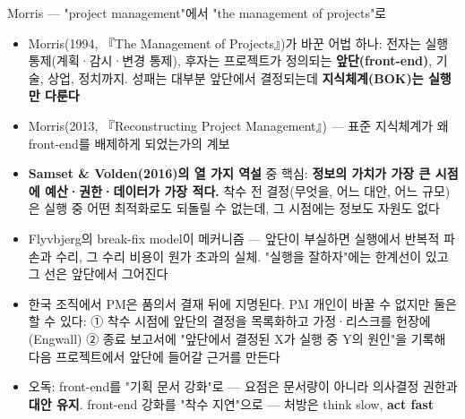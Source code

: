 \begin{frame}[allowframebreaks=1.0]{Morris — "project management"에서 "the management of projects"로}
\small
\begin{itemize}
\item\relax Morris(1994, 『The Management of Projects』)가 바꾼 어법 하나: 전자는 실행 통제(계획·감시·변경 통제), 후자는 프로젝트가 정의되는 \textbf{앞단(front-end)}, 기술, 상업, 정치까지. 성패는 대부분 앞단에서 결정되는데 \textbf{지식체계(BOK)는 실행만 다룬다}
\item\relax Morris(2013, 『Reconstructing Project Management』) — 표준 지식체계가 왜 front-end를 배제하게 되었는가의 계보
\item\relax \textbf{Samset \& Volden(2016)의 열 가지 역설} 중 핵심: \textbf{정보의 가치가 가장 큰 시점에 예산·권한·데이터가 가장 적다.} 착수 전 결정(무엇을, 어느 대안, 어느 규모)은 실행 중 어떤 최적화로도 되돌릴 수 없는데, 그 시점에는 정보도 자원도 없다
\item\relax Flyvbjerg의 break-fix model이 메커니즘 — 앞단이 부실하면 실행에서 반복적 파손과 수리, 그 수리 비용이 원가 초과의 실체. "실행을 잘하자"에는 한계선이 있고 그 선은 앞단에서 그어진다
\item\relax 한국 조직에서 PM은 품의서 결재 뒤에 지명된다. PM 개인이 바꿀 수 없지만 둘은 할 수 있다: ① 착수 시점에 앞단의 결정을 목록화하고 가정·리스크를 헌장에(Engwall) ② 종료 보고서에 "앞단에서 결정된 X가 실행 중 Y의 원인"을 기록해 다음 프로젝트에서 앞단에 들어갈 근거를 만든다
\item\relax 오독: front-end를 "기획 문서 강화"로 — 요점은 문서량이 아니라 의사결정 권한과 \textbf{대안 유지}. front-end 강화를 "착수 지연"으로 — 처방은 think slow, \textbf{act fast}
\end{itemize}
\end{frame}

